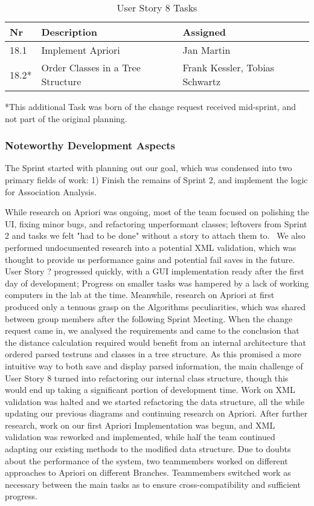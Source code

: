 \begin{table}[h]
  \caption{User Story 8 Tasks}
  \label{Story 8 Tasks}
  \centering
  \begin{tabular}{p{1cm}|p{5cm}|p{3cm}|}
  	Nr & Description & Assigned \\ 
  	\hline
  	18.1 & Implement Apriori & Jan Martin \\ 
  	\hline
  	18.2* & Order Classes in a Tree Structure & Frank Kessler, Tobias Schwartz \\ 
  	\hline
  \end{tabular}
\end{table}
*This additional Task was born of the change request received mid-sprint, and not part of the original planning.




\subsubsection*{Noteworthy Development Aspects}

The Sprint started with planning out our goal, which was condensed into two primary fields of work: 1) Finish the remains of Sprint 2, and implement the logic for Association Analysis. 

While research on Apriori was ongoing, most of the team focused on polishing the UI, fixing minor bugs, and refactoring unperformant classes; leftovers from Sprint 2 and tasks we felt "had to be done" without a story to attach them to. \ 
We also performed undocumented research into a potential XML validation, which was thought to provide us performance gains and potential fail saves in the future.
User Story ? progressed quickly, with a GUI implementation ready after the first day of development; Progress on smaller tasks was hampered by a lack of working computers in the lab at the time.
Meanwhile, research on Apriori at first produced only a tenuous grasp on the Algorithms peculiarities, which was shared between group members after the following Sprint Meeting. 
When the change request came in, we analysed the requirements and came to the conclusion that the distance calculation required would benefit from an internal architecture that ordered parsed testruns and classes in a tree structure. 
As this promised a more intuitive way to both save and display parsed information, the main challenge of User Story 8 turned into refactoring our internal class structure, though this would end up taking a significant portion of development time. 
Work on XML validation was halted and we started refactoring the data structure, all the while updating our previous diagrams and continuing research on Apriori.
After further research, work on our first Apriori Implementation was begun, and XML validation was reworked and implemented, while half the team continued adapting our existing methods to the modified data structure. Due to doubts about the performance of the system, two teammembers worked on different approaches to Apriori on different Branches. Teammembers switched work as necessary between the main tasks as to ensure cross-compatibility and sufficient progress. 

